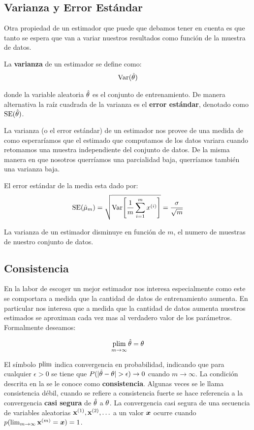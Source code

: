 \subsection{Varianza y Error Estándar}
Otra propiedad de un estimador que puede que debamos tener en cuenta es que tanto se espera que van a variar nuestros resultados como función de la muestra de datos.

La \textbf{varianza} de un estimador se define como:
\begin{equation}
  \mathrm{Var}(\hat{{\mathbf{\theta}}})
\end{equation}

donde la variable aleatoria $\hat{{\mathbf{\theta}}}$ es el conjunto de entrenamiento. De manera alternativa la raíz cuadrada de la varianza es el \textbf{error estándar}, denotado como $\mathrm{SE}(\hat{{\mathbf{\theta}}})$.

La varianza (o el error estándar) de un estimador nos provee de una medida de como esperaríamos que el estimado que computamos de los datos variara cuando retomamos una muestra independiente del conjunto de datos. De la misma manera en que nosotros querríamos una parcialidad baja, querríamos también una varianza baja.

El error estándar de la media esta dado por:
\begin{equation}
  \mathrm{SE}(\hat{\mu}_m) = \sqrt{ \mathrm{Var}{\Bigg[ \frac{1}{m} \sum_{i=1}^{m} x^{(i)} \Bigg]} } = \frac{\sigma}{\sqrt{m}}
\end{equation}
    
La varianza de un estimador disminuye en función de $m$, el numero de muestras de nuestro conjunto de datos.

\subsection{Consistencia}
En la labor de escoger un mejor estimador nos interesa especialmente como este se comportara a medida que la cantidad de datos de entrenamiento aumenta. En particular nos interesa que a medida que la cantidad de datos aumenta nuestros estimados se aproximan cada vez mas al verdadero valor de los parámetros. Formalmente deseamos:

\begin{equation} \label{eq:consistency}
  \operatorname*{plim}_{m\to\infty} \hat{{\mathbf{\theta}}} = {\mathbf{\theta}}
\end{equation}

El símbolo $\operatorname*{plim}$ indica convergencia en probabilidad, indicando que para cualquier $\epsilon > 0$ se tiene que $P(|\hat{{\mathbf{\theta}}} - {\mathbf{\theta}}| > \epsilon) \to 0$ cuando $m \to \infty$. La condición descrita en la  se le conoce como \textbf{consistencia}. Algunas veces se le llama consistencia débil, cuando se refiere a consistencia fuerte se hace referencia a la convergencia \textbf{casi segura} de $\hat{{\mathbf{\theta}}}$ a ${\mathbf{\theta}}$. La convergencia casi segura de una secuencia de variables aleatorias ${\mathbf{x}}^{(1)}, {\mathbf{x}}^{(2)}, \ldots$ a un valor ${\bm{x}}$ ocurre cuando $p(\lim_{m\to\infty}{\mathbf{x}}^{(m)} = {\bm{x}}) = 1$.

